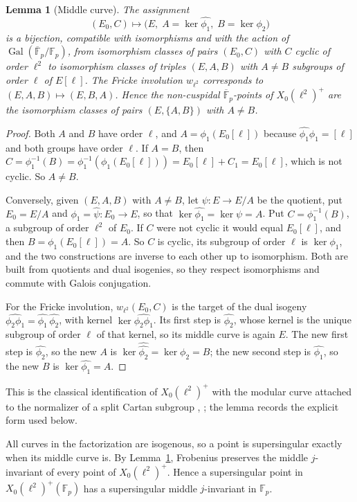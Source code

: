 \documentclass[11pt,a4paper]{article}
\newtheorem{lemma}[theorem]{Lemma}
\theoremstyle{remark}\newtheorem{remark}[theorem]{Remark}
\numberwithin{equation}{section}
\newcommand{\Fp}{\mathbb F_p}
\newcommand{\kk}{\overline{\mathbb F}_p}
\begin{document}
\begin{lemma}[Middle curve]\label{lem:middle}
The assignment
\[
(E_0,C)\longmapsto\bigl(E,\;A=\ker\widehat{\phi_1},\;B=\ker\phi_2\bigr)
\]
is a bijection, compatible with isomorphisms and with the action of $\operatorname{Gal}(\kk/\Fp)$, from isomorphism classes of pairs $(E_0,C)$ with $C$ cyclic of order $\ell^2$ to isomorphism classes of triples $(E,A,B)$ with $A\neq B$ subgroups of order $\ell$ of $E[\ell]$. The Fricke involution $w_{\ell^2}$ corresponds to $(E,A,B)\mapsto(E,B,A)$. Hence the non-cuspidal $\kk$-points of $X_0(\ell^2)^+$ are the isomorphism classes of pairs $(E,\{A,B\})$ with $A\neq B$.
\end{lemma}
\begin{proof}
Both $A$ and $B$ have order $\ell$, and $A=\phi_1(E_0[\ell])$ because $\widehat{\phi_1}\phi_1=[\ell]$ and both groups have order $\ell$. If $A=B$, then $C=\phi_1^{-1}(B)=\phi_1^{-1}(\phi_1(E_0[\ell]))=E_0[\ell]+C_1=E_0[\ell]$, which is not cyclic. So $A\neq B$.

Conversely, given $(E,A,B)$ with $A\neq B$, let $\psi\colon E\to E/A$ be the quotient, put $E_0=E/A$ and $\phi_1=\widehat\psi\colon E_0\to E$, so that $\ker\widehat{\phi_1}=\ker\psi=A$. Put $C=\phi_1^{-1}(B)$, a subgroup of order $\ell^2$ of $E_0$. If $C$ were not cyclic it would equal $E_0[\ell]$, and then $B=\phi_1(E_0[\ell])=A$. So $C$ is cyclic, its subgroup of order $\ell$ is $\ker\phi_1$, and the two constructions are inverse to each other up to isomorphism. Both are built from quotients and dual isogenies, so they respect isomorphisms and commute with Galois conjugation.

For the Fricke involution, $w_{\ell^2}(E_0,C)$ is the target of the dual isogeny $\widehat{\phi_2\phi_1}=\widehat{\phi_1}\,\widehat{\phi_2}$, with kernel $\ker\widehat{\phi_2\phi_1}$. Its first step is $\widehat{\phi_2}$, whose kernel is the unique subgroup of order $\ell$ of that kernel, so its middle curve is again $E$. The new first step is $\widehat{\phi_2}$, so the new $A$ is $\ker\widehat{\widehat{\phi_2}}=\ker\phi_2=B$; the new second step is $\widehat{\phi_1}$, so the new $B$ is $\ker\widehat{\phi_1}=A$.
\end{proof}

This is the classical identification of $X_0(\ell^2)^+$ with the modular curve attached to the normalizer of a split Cartan subgroup \cite{Chen}, \cite[p.~412]{RW}; the lemma records the explicit form used below.

All curves in the factorization are isogenous, so a point is supersingular exactly when its middle curve is. By Lemma~\ref{lem:middle}, Frobenius preserves the middle $j$-invariant of every point of $X_0(\ell^2)^+$. Hence a supersingular point in $X_0(\ell^2)^+(\Fp)$ has a supersingular middle $j$-invariant in $\Fp$.
\end{document}
